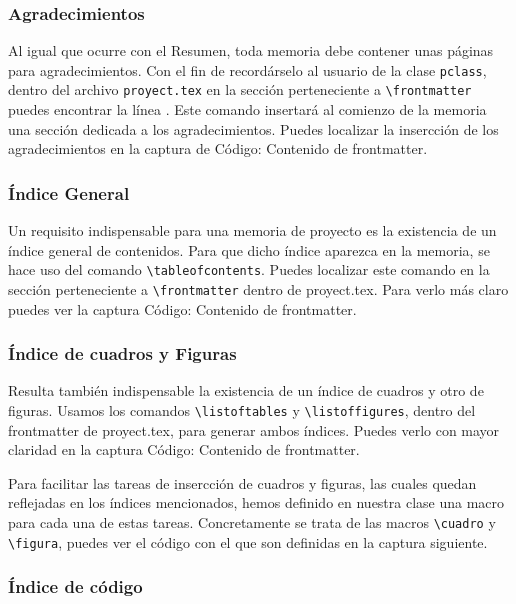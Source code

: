 


\subsubsection{Agradecimientos}
Al igual que ocurre con el Resumen, toda memoria debe contener unas p\'aginas para agradecimientos. Con el fin de 
record\'arselo al usuario de la clase \texttt{pclass}, dentro del archivo \texttt{proyect.tex} en la secci\'on perteneciente a \verb+\frontmatter+ puedes encontrar la l\'inea \verb++. Este comando insertar\'a al comienzo
de la memoria una secci\'on dedicada a los agradecimientos. Puedes localizar la insercci\'on de los agradecimientos en 
la captura de C\'odigo: Contenido de frontmatter.

\subsubsection{\'Indice General}
Un requisito indispensable para una memoria de proyecto es la existencia de un \'indice general de contenidos. Para 
que dicho \'indice aparezca en la memoria, se hace uso del comando \verb+\tableofcontents+. Puedes localizar este comando
en la secci\'on perteneciente a \verb+\frontmatter+ dentro de proyect.tex. Para verlo m\'as claro puedes ver la
captura C\'odigo: Contenido de frontmatter.

\subsubsection{\'Indice de cuadros y Figuras}
Resulta tambi\'en indispensable la existencia de un \'indice de cuadros y otro de figuras. Usamos los comandos
\verb+\listoftables+ y \verb+\listoffigures+, dentro del frontmatter de proyect.tex, para generar ambos \'indices.
Puedes verlo con mayor claridad en la captura C\'odigo: Contenido de frontmatter.

Para facilitar las tareas de insercci\'on de cuadros y figuras, las cuales quedan reflejadas en los \'indices mencionados,
hemos definido en nuestra clase una macro para cada una de estas tareas. Concretamente se trata de las macros 
\verb+\cuadro+ y \verb+\figura+, puedes ver el c\'odigo con el que son definidas en la captura siguiente.



\subsubsection{\'Indice de c\'odigo}


